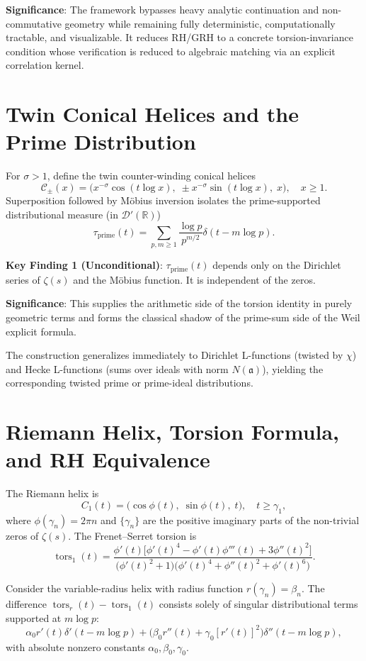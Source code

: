 \documentclass[11pt,a4paper]{article}
\begin{document}
\textbf{Significance}: The framework bypasses heavy analytic continuation and non-commutative geometry while remaining fully deterministic, computationally tractable, and visualizable. It reduces RH/GRH to a concrete torsion-invariance condition whose verification is reduced to algebraic matching via an explicit correlation kernel.

\section{Twin Conical Helices and the Prime Distribution}

For \(\sigma > 1\), define the twin counter-winding conical helices
\[
\mathcal{C}_\pm(x) = \bigl( x^{-\sigma} \cos(t \log x),\; \pm x^{-\sigma} \sin(t \log x),\; x \bigr), \quad x \ge 1.
\]
Superposition followed by Möbius inversion isolates the prime-supported distributional measure (in \(\mathcal{D}'(\mathbb{R})\))
\[
\tau_{\mathrm{prime}}(t) = \sum_{p,m \ge 1} \frac{\log p}{p^{m/2}} \delta(t - m \log p).
\]

\textbf{Key Finding 1 (Unconditional)}: \(\tau_{\mathrm{prime}}(t)\) depends only on the Dirichlet series of \(\zeta(s)\) and the Möbius function. It is independent of the zeros.

\textbf{Significance}: This supplies the arithmetic side of the torsion identity in purely geometric terms and forms the classical shadow of the prime-sum side of the Weil explicit formula.

The construction generalizes immediately to Dirichlet L-functions (twisted by \(\chi\)) and Hecke L-functions (sums over ideals with norm \(N(\mathfrak{a})\)), yielding the corresponding twisted prime or prime-ideal distributions.

\section{Riemann Helix, Torsion Formula, and RH Equivalence}

The Riemann helix is
\[
C_1(t) = \bigl( \cos\phi(t),\; \sin\phi(t),\; t \bigr), \quad t \ge \gamma_1,
\]
where \(\phi(\gamma_n) = 2\pi n\) and \(\{\gamma_n\}\) are the positive imaginary parts of the non-trivial zeros of \(\zeta(s)\). The Frenet--Serret torsion is
\[
\operatorname{tors}_1(t) = \frac{\phi'(t) \bigl[ \phi'(t)^4 - \phi'(t) \phi'''(t) + 3 \phi''(t)^2 \bigr] }{ \bigl( \phi'(t)^2 + 1 \bigr) \bigl( \phi'(t)^4 + \phi''(t)^2 + \phi'(t)^6 \bigr) }.
\]

Consider the variable-radius helix with radius function \(r(\gamma_n) = \beta_n\). The difference \(\operatorname{tors}_r(t) - \operatorname{tors}_1(t)\) consists solely of singular distributional terms supported at \(m\log p\):
\[
\alpha_0 r'(t)\delta'(t-m\log p) + \bigl(\beta_0 r''(t) + \gamma_0 [r'(t)]^2\bigr)\delta''(t-m\log p),
\]
with absolute nonzero constants \(\alpha_0,\beta_0,\gamma_0\).
\end{document}
